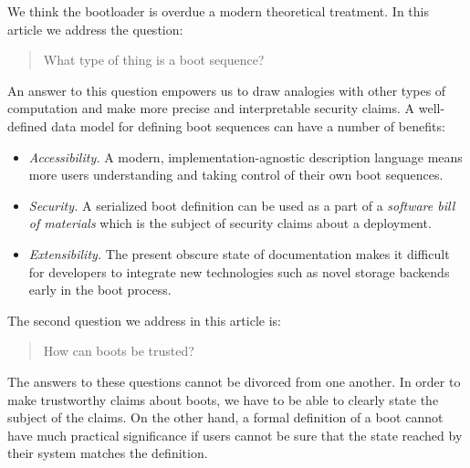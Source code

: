 \begin{comment}
\begin{remark}
  
  Clearly, it is neither practical nor desirable for system state to be literally immutable, or reproducible: at the very least, we expect that the machine clock ticks on, IP traffic is processed, logs accumulate, and the state of stateful software evolves whle the machine is operational.

  Nonetheless, some 
  A simple view on determinism asks only that the configuration and software installed on a system together with the set of active services be reproducible.
  In a Linux environment, this might mean invariance of the contents of the $\mathtt{/boot}$, $\mathtt{/etc}$, and $\mathtt{/usr}$ trees.

\end{remark}
\end{comment}

We think the bootloader is overdue a modern theoretical treatment. 
%
In this article we address the question:
\begin{quote}
  What type of thing is a boot sequence?
\end{quote}
%
An answer to this question empowers us to draw analogies with other types of computation and make more precise and interpretable security claims.
%
A well-defined data model for defining boot sequences can have a number of benefits:

\begin{itemize}
\tightlist
\item
  \emph{Accessibility.} A modern, implementation-agnostic description language means more users understanding and taking control of their own boot sequences.
\item
  \emph{Security.} A serialized boot definition can be used as a part of a \emph{software bill of materials} which is the subject of security claims about a deployment.
\item
  \emph{Extensibility.} The present obscure state of documentation makes it difficult for developers to integrate new technologies such as novel storage backends early in the boot process.
\end{itemize}

The second question we address in this article is:
\begin{quote}
  How can boots be trusted?
\end{quote}

The answers to these questions cannot be divorced from one another.
%
In order to make trustworthy claims about boots, we have to be able to clearly state the subject of the claims.
%
On the other hand, a formal definition of a boot cannot have much practical significance if users cannot be sure that the state reached by their system matches the definition.

